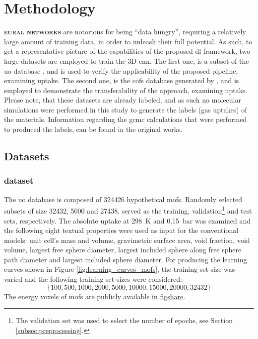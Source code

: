 \chapter{Methodology}

\lettrine[
	nindent=0em, findent=0.5em, loversize=-0.12, lines=5
]{}{\bfseries\color{Blue}eural networks} are
notorious for being ``data hungry'', requiring a relatively large amount of
training data, in order to unleash their full potential. As
such, to get a representative picture of the capabilities of the proposed
\gls{dl} framework, two large datasets are employed to train the
3D \gls{cnn}. The first one, is a subset of the \gls{uo} database \parencite{Boyd_2019}, and is used to verify the applicability of the
proposed pipeline, examining  uptake. The second one, is the \glspl{cof}
database generated by \parencite{Mercado_2018}, and is employed to demonstrate the
transferability of the approach, examining  uptake. Please note, that
these datasets are already labeled, and as such no molecular
simulations were performed in this study to
generate the labels (gas uptakes) of the
materials. Information regarding the \gls{gcmc} calculations that were performed
to produced the labels, can be found in the original works.

\section{Datasets}
\label{sec:datasets}

\subsection{ dataset}

The \gls{uo} database is composed of \num{324426} hypothetical
\glspl{mof}. Randomly selected subsets of size
\num{32432}, \num{5000} and \num{27438}, served as the training, validation\footnote{The validation set was used to
select the number of epochs, see Section \ref{subsec:preprocessing}.} and test
sets, respectively. The absolute  uptake at
\SI{298}{\kelvin} and \SI{0.15}{\bar} was examined and the following eight
textual properties were used as input for the
conventional models: unit cell's mass and volume, gravimetric surface area, void
fraction, void volume, largest free sphere diameter, largest included sphere
along free sphere path diameter and largest included sphere diameter. For
producing the learning curves shown in Figure
\ref{fig:learning_curves_mofs}, the training set size was varied and the following
training set sizes were considered:
\begin{equation}
	\{
		\num{100}, \num{500}, \num{1000},
		\num{2000}, \num{5000}, \num{10000},
		\num{15000}, \num{20000}, \num{32432}
	\}
\end{equation}
The energy voxels of \glspl{mof} are publicly available in
\href{https://figshare.com/articles/dataset/RetNet/24598845}{figshare}.

